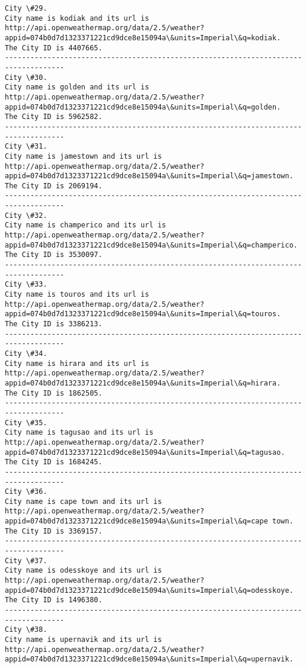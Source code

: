 \documentclass[11pt]{article}
\begin{document}
\begin{Verbatim}[commandchars=\\\{\}]
City \#29.
City name is kodiak and its url is http://api.openweathermap.org/data/2.5/weather?appid=074b0d7d1323371221cd9dce8e15094a\&units=Imperial\&q=kodiak.
The City ID is 4407665.
------------------------------------------------------------------------------------
City \#30.
City name is golden and its url is http://api.openweathermap.org/data/2.5/weather?appid=074b0d7d1323371221cd9dce8e15094a\&units=Imperial\&q=golden.
The City ID is 5962582.
------------------------------------------------------------------------------------
City \#31.
City name is jamestown and its url is http://api.openweathermap.org/data/2.5/weather?appid=074b0d7d1323371221cd9dce8e15094a\&units=Imperial\&q=jamestown.
The City ID is 2069194.
------------------------------------------------------------------------------------
City \#32.
City name is champerico and its url is http://api.openweathermap.org/data/2.5/weather?appid=074b0d7d1323371221cd9dce8e15094a\&units=Imperial\&q=champerico.
The City ID is 3530097.
------------------------------------------------------------------------------------
City \#33.
City name is touros and its url is http://api.openweathermap.org/data/2.5/weather?appid=074b0d7d1323371221cd9dce8e15094a\&units=Imperial\&q=touros.
The City ID is 3386213.
------------------------------------------------------------------------------------
City \#34.
City name is hirara and its url is http://api.openweathermap.org/data/2.5/weather?appid=074b0d7d1323371221cd9dce8e15094a\&units=Imperial\&q=hirara.
The City ID is 1862505.
------------------------------------------------------------------------------------
City \#35.
City name is tagusao and its url is http://api.openweathermap.org/data/2.5/weather?appid=074b0d7d1323371221cd9dce8e15094a\&units=Imperial\&q=tagusao.
The City ID is 1684245.
------------------------------------------------------------------------------------
City \#36.
City name is cape town and its url is http://api.openweathermap.org/data/2.5/weather?appid=074b0d7d1323371221cd9dce8e15094a\&units=Imperial\&q=cape town.
The City ID is 3369157.
------------------------------------------------------------------------------------
City \#37.
City name is odesskoye and its url is http://api.openweathermap.org/data/2.5/weather?appid=074b0d7d1323371221cd9dce8e15094a\&units=Imperial\&q=odesskoye.
The City ID is 1496380.
------------------------------------------------------------------------------------
City \#38.
City name is upernavik and its url is http://api.openweathermap.org/data/2.5/weather?appid=074b0d7d1323371221cd9dce8e15094a\&units=Imperial\&q=upernavik.

\end{Verbatim}
\end{document}
